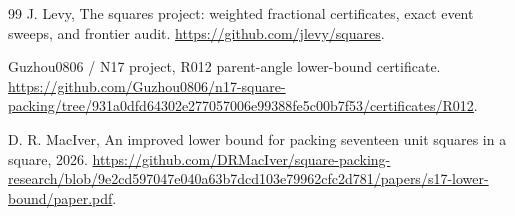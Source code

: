\documentclass[11pt]{article}
\begin{document}
\begin{thebibliography}{99}
J. Levy,
\newblock The squares project: weighted fractional certificates, exact event sweeps, and frontier audit.
\newblock \url{https://github.com/jlevy/squares}.

Guzhou0806 / N17 project,
\newblock R012 parent-angle lower-bound certificate.
\newblock \url{https://github.com/Guzhou0806/n17-square-packing/tree/931a0dfd64302e277057006e99388fe5c00b7f53/certificates/R012}.

D. R. MacIver,
\newblock An improved lower bound for packing seventeen unit squares in a square, 2026.
\newblock \url{https://github.com/DRMacIver/square-packing-research/blob/9e2cd597047e040a63b7dcd103e79962cfc2d781/papers/s17-lower-bound/paper.pdf}.

\end{thebibliography}
\end{document}
